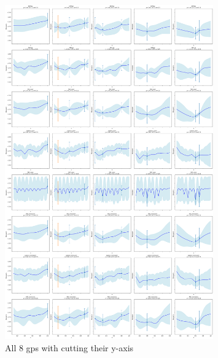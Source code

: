 \documentclass{article}
\begin{document}
\begin{figure}[H]
    \centering
    \includegraphics[width=0.8\textwidth]{LatexPlots/final_gps_plots/final_gps_ycuts.png}
    \caption{All 8 gps with cutting their y-axis}
    \label{fig:best8_ycuts}
\end{figure}
\end{document}
